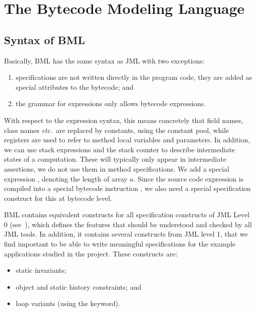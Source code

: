\section{The Bytecode Modeling Language}
\label{SecBML}


\subsection{Syntax of BML}

Basically, BML has the same syntax as JML with two exceptions:
\begin{enumerate}
\item specifications are not written directly in the program code,
they are added as special attributes to the bytecode; and
\item the grammar for expressions only allows bytecode expressions.
\end{enumerate}

With respect to the expression syntax, this means concretely that
field names, class names \emph{etc.}\ are replaced by constants, using
the constant pool, while registers are used to refer to method local
variables and parameters. In addition, we can use stack expressions
and the stack counter to describe intermediate states of a
computation.  These will typically only appear in intermediate
assertions, we do not use them in method specifications. We
add a special expression
, denoting the length of array \(a\). Since the 
source code expression  is compiled into a
special bytecode instruction , we also need a
special specification construct for this at bytecode level.

BML contains equivalent constructs for all specification constructs of
JML Level 0 (see~\cite[\S2.9]{JMLReferenceManual05}), which defines
the features that should be understood and checked by all JML
tools. In addition, it contains several constructs from JML level 1,
that we find important to be able to write meaningful specifications
for the example applications studied in the \mobius project. These
constructs are:
\begin{itemize}
\item static invariants;
\item object and static history constraints; and 
\item loop variants (using the  keyword).
\end{itemize}


